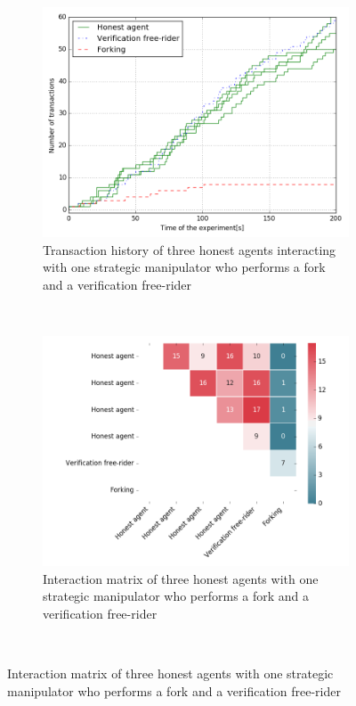 \begin{figure}
    \begin{subfigure}{\textwidth}
      \centering
      \includegraphics[width=.6\linewidth]{images/verification_doublespend_honest}
      \caption{Transaction history of three honest agents interacting with one strategic manipulator who performs a fork and a verification free-rider}
      \label{fig:verification_doublespend_honest}
    \end{subfigure}\\
    \begin{subfigure}{\textwidth}
      \centering
      \includegraphics[width=.6\linewidth]{images/verification_doublespend_honest_matrix}
      \caption{Interaction matrix of three honest agents with one strategic manipulator who performs a fork and a verification free-rider}
      \label{fig:verification_doublespend_honest_matrix}
    \end{subfigure}\\
\end{figure}

